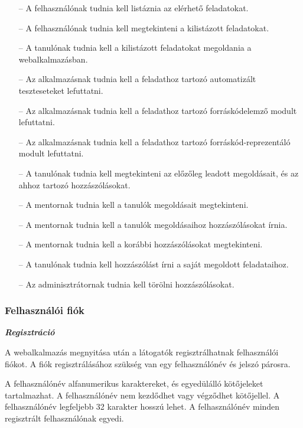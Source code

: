 \begin{itemize}
    \item[--] A felhasználónak tudnia kell listáznia az elérhető feladatokat.
    \item[--] A felhasználónak tudnia kell megtekinteni a kilistázott feladatokat.
    \item[--] A tanulónak tudnia kell a kilistázott feladatokat megoldania a webalkalmazásban.
    \item[--] Az alkalmazásnak tudnia kell a feladathoz tartozó automatizált teszteseteket lefuttatni.
    \item[--] Az alkalmazásnak tudnia kell a feladathoz tartozó forráskódelemző modult lefuttatni.
    \item[--] Az alkalmazásnak tudnia kell a feladathoz tartozó forráskód-reprezentáló modult lefuttatni.
    \item[--] A tanulónak tudnia kell megtekinteni az előzőleg leadott megoldásait, és az ahhoz tartozó hozzászólásokat.
    \item[--] A mentornak tudnia kell a tanulók megoldásait megtekinteni.
    \item[--] A mentornak tudnia kell a tanulók megoldásaihoz hozzászólásokat írnia.
    \item[--] A mentornak tudnia kell a korábbi hozzászólásokat megtekinteni.
    \item[--] A tanulónak tudnia kell hozzászólást írni a saját megoldott feladataihoz.
    \item[--] Az adminisztrátornak tudnia kell törölni hozzászólásokat.
\end{itemize}


\subsubsection{Felhasználói fiók}

\textbf{\textit{Regisztráció}}

A webalkalmazás megnyitása után a látogatók regisztrálhatnak felhasználói fiókot. A fiók regisztrálásához  szükség van egy felhasználónév és jelszó párosra.

A felhasználónév alfanumerikus karaktereket, és egyedülálló kötőjeleket tartalmazhat. A felhasználónév nem kezdődhet vagy végződhet kötőjellel. A felhasználónév legfeljebb 32 karakter hosszú lehet. A felhasználónév minden regisztrált felhasználónak egyedi.

